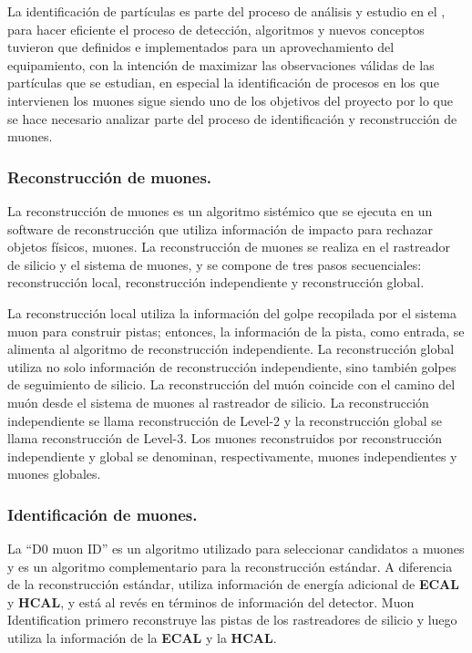 La identificación de partículas es parte del proceso de análisis y estudio en el \LHC, para hacer eficiente el proceso de detección, algoritmos y nuevos conceptos tuvieron que definidos e implementados para un aprovechamiento del equipamiento, con la intención de maximizar las observaciones válidas de las partículas que se estudian, en especial la identificación de procesos en los que intervienen los muones sigue siendo uno de los objetivos del proyecto por lo que se hace necesario analizar parte del proceso de identificación y reconstrucción de muones.

\subsubsection{Reconstrucción de muones.}
La reconstrucción de muones es un algoritmo sistémico que se ejecuta en un software de reconstrucción que utiliza información de impacto para rechazar objetos físicos, muones. La reconstrucción de muones se realiza en el rastreador de silicio y el sistema de muones, y se compone de tres pasos secuenciales: reconstrucción local, reconstrucción independiente y reconstrucción global. 

La reconstrucción local utiliza la información del golpe recopilada por el sistema muon para construir pistas; entonces, la información de la pista, como entrada, se alimenta al algoritmo de reconstrucción independiente. La reconstrucción global utiliza no solo información de reconstrucción independiente, sino también golpes de seguimiento de silicio. La reconstrucción del muón coincide con el camino del muón desde el sistema de muones al rastreador de silicio. La reconstrucción independiente se llama reconstrucción de Level-2 y la reconstrucción global se llama reconstrucción de Level-3. Los muones reconstruidos por reconstrucción independiente y global se denominan, respectivamente, muones independientes y muones globales.

\subsubsection{Identificación de muones.}

La ``D0 muon ID'' es un algoritmo utilizado para seleccionar candidatos a muones y es un algoritmo complementario para la reconstrucción estándar. A diferencia de la reconstrucción estándar, utiliza información de energía adicional de \textbf{ECAL} y \textbf{HCAL}, y está al revés en términos de información del detector. Muon Identification primero reconstruye las pistas de los rastreadores de silicio y luego utiliza la información de la \textbf{ECAL} y la \textbf{HCAL}.

